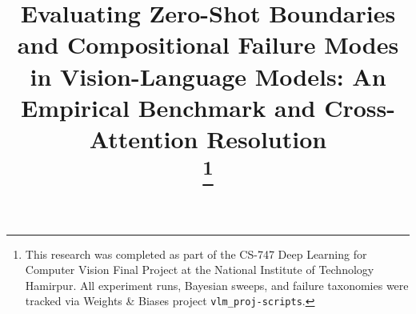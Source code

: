 \documentclass[conference]{IEEEtran}
\begin{document}
\title{Evaluating Zero-Shot Boundaries and Compositional Failure Modes in Vision-Language Models: An Empirical Benchmark and Cross-Attention Resolution\\
\thanks{This research was completed as part of the CS-747 Deep Learning for Computer Vision Final Project at the National Institute of Technology Hamirpur. All experiment runs, Bayesian sweeps, and failure taxonomies were tracked via Weights \& Biases project \texttt{vlm\_proj-scripts}.}
}

\author{
}

\maketitle
\end{document}
